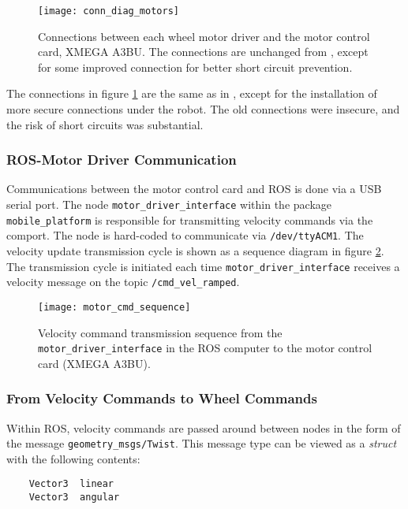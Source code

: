\begin{figure}[h]
	\centering
	\texttt{[image: conn\_diag\_motors]}
	\caption{Connections between each wheel motor driver and the motor control card, XMEGA A3BU. The connections are unchanged from \cite{aspunvik}, except for some improved connection for better short circuit prevention.}
	\label{fig:conn_diag_motors}
\end{figure}

The connections in figure \ref{fig:conn_diag_motors} are the same as in \cite{aspunvik}, except for the installation of more secure connections under the robot. The old connections were insecure, and the risk of short circuits was substantial.

\subsubsection{ROS-Motor Driver Communication}

Communications between the motor control card and \ac{ROS} is done via a USB serial port. The node \texttt{motor\_driver\_interface} within the package \texttt{mobile\_platform} is responsible for transmitting velocity commands via the comport. The node is hard-coded to communicate via \texttt{/dev/ttyACM1}.  The velocity update transmission cycle is shown as a sequence diagram in figure \ref{fig:motor_cmd_sequence}. The transmission cycle is initiated each time \texttt{motor\_driver\_interface} receives a velocity message on the topic \texttt{/cmd\_vel\_ramped}.

\begin{figure}[h]
	\centering
	\texttt{[image: motor\_cmd\_sequence]}
	\caption{Velocity command transmission sequence from the \texttt{motor\_driver\_interface} in the ROS computer to the motor control card (XMEGA A3BU).}
	\label{fig:motor_cmd_sequence}
\end{figure}

\subsubsection{From Velocity Commands to Wheel Commands}

Within \ac{ROS}, velocity commands are passed around between nodes in the form of the message \texttt{geometry\_msgs/Twist}. This message type can be viewed as a \textit{struct} with the following contents:

\begin{verbatim}
	Vector3  linear
	Vector3  angular
\end{verbatim}

